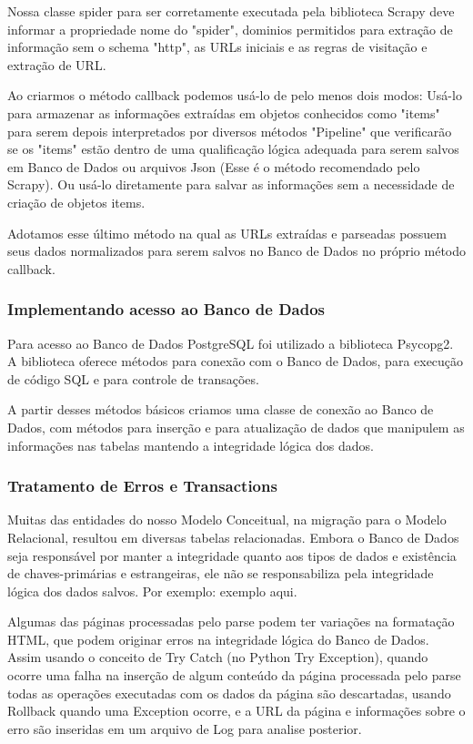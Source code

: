 \documentclass[12pt]{article}
\begin{document}
Nossa classe spider para ser corretamente executada pela biblioteca Scrapy deve informar a propriedade nome do "spider", dominios permitidos para extração de informação sem o schema "http", as URLs iniciais e as regras de visitação e extração de URL.

Ao criarmos o método callback podemos usá-lo de pelo menos dois modos: Usá-lo para armazenar as informações extraídas em objetos conhecidos como "items" para serem depois interpretados por diversos métodos "Pipeline" que verificarão se os "items" estão dentro de uma qualificação lógica adequada para serem salvos em Banco de Dados ou arquivos Json (Esse é o método recomendado pelo Scrapy). Ou usá-lo diretamente para salvar as informações sem a necessidade de criação de objetos items.

Adotamos esse último método na qual as URLs extraídas e parseadas possuem seus dados normalizados para serem salvos no Banco de Dados no próprio método callback.
 
 
\subsubsection{Implementando acesso ao Banco de Dados}

Para acesso ao Banco de Dados PostgreSQL foi utilizado a biblioteca Psycopg2. A biblioteca oferece métodos para conexão com o Banco de Dados, para execução de código SQL e para controle de transações.

A partir desses métodos básicos criamos uma classe de conexão ao Banco de Dados, com métodos para inserção e para atualização de dados que manipulem as informações nas tabelas mantendo a integridade lógica dos dados.

\subsubsection{Tratamento de Erros e Transactions}

Muitas das entidades do nosso Modelo Conceitual, na migração para o Modelo Relacional, resultou em diversas tabelas relacionadas. Embora o Banco de Dados seja responsável por manter a integridade quanto aos tipos de dados e existência de chaves-primárias e estrangeiras, ele não se responsabiliza pela integridade lógica dos dados salvos. Por exemplo: {exemplo aqui.}


Algumas das páginas processadas pelo parse podem ter variações na formatação HTML, que podem originar erros na integridade lógica do Banco de Dados. Assim usando o conceito de Try Catch (no Python Try Exception), quando ocorre uma falha na inserção de algum conteúdo da página processada pelo parse todas as operações executadas com os dados da página são descartadas, usando Rollback quando uma Exception ocorre, e a URL da página e informações sobre o erro são inseridas em um arquivo de Log para analise posterior.
\end{document}
